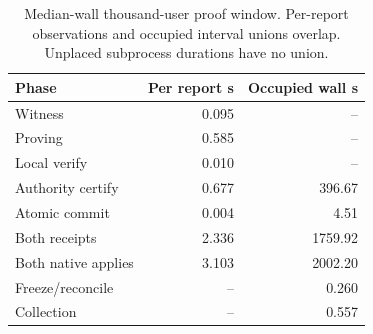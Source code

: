 \begin{table}[t]
\centering
\caption{Median-wall thousand-user proof window. Per-report observations and occupied interval unions overlap. Unplaced subprocess durations have no union.}
\label{tab:scale-final-phases}
\footnotesize
\setlength{\tabcolsep}{3pt}
\begin{tabular}{@{}lrr@{}}
\toprule
Phase & Per report s & Occupied wall s \\
\midrule
Witness & 0.095 & -- \\
Proving & 0.585 & -- \\
Local verify & 0.010 & -- \\
Authority certify & 0.677 & 396.67 \\
Atomic commit & 0.004 & 4.51 \\
Both receipts & 2.336 & 1759.92 \\
Both native applies & 3.103 & 2002.20 \\
Freeze/reconcile & -- & 0.260 \\
Collection & -- & 0.557 \\
\bottomrule
\end{tabular}
\end{table}
